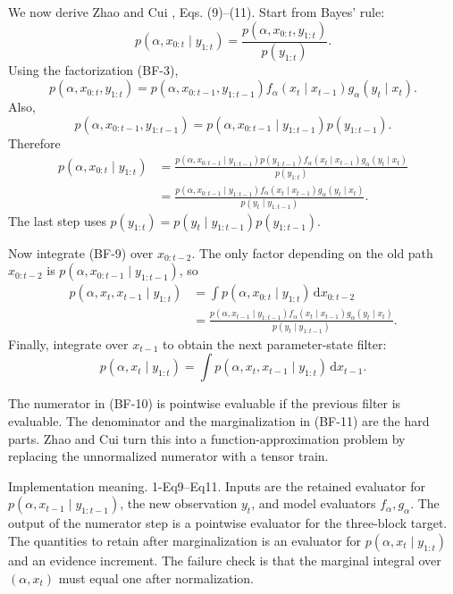 \documentclass[11pt]{article}
\numberwithin{equation}{section}
\newcommand{\dd}{\,\mathrm d}
\begin{document}
We now derive Zhao and Cui \cite{zhao2024ttsequential}, Eqs. (9)--(11).  Start from Bayes' rule:
\[
 p(\alpha,x_{0:t}\mid y_{1:t})
 =
 \frac{p(\alpha,x_{0:t},y_{1:t})}{p(y_{1:t})}.
\]
Using the factorization (BF-3),
\[
 p(\alpha,x_{0:t},y_{1:t})
 =
 p(\alpha,x_{0:t-1},y_{1:t-1})
 f_\alpha(x_t\mid x_{t-1})g_\alpha(y_t\mid x_t).
\]
Also,
\[
 p(\alpha,x_{0:t-1},y_{1:t-1})
 =
 p(\alpha,x_{0:t-1}\mid y_{1:t-1})p(y_{1:t-1}).
\]
Therefore
\begin{equation}
\begin{aligned}
 p(\alpha,x_{0:t}\mid y_{1:t})
 &=
 \frac{
 p(\alpha,x_{0:t-1}\mid y_{1:t-1})p(y_{1:t-1})
 f_\alpha(x_t\mid x_{t-1})g_\alpha(y_t\mid x_t)}
 {p(y_{1:t})}\\
 &=
 \frac{
 p(\alpha,x_{0:t-1}\mid y_{1:t-1})
 f_\alpha(x_t\mid x_{t-1})g_\alpha(y_t\mid x_t)}
 {p(y_t\mid y_{1:t-1})}.
\end{aligned}
\label{eq:p24-bf-9}
\end{equation}
The last step uses \(p(y_{1:t})=p(y_t\mid y_{1:t-1})p(y_{1:t-1})\).

Now integrate (BF-9) over \(x_{0:t-2}\).  The only factor depending on the old
path \(x_{0:t-2}\) is
\(p(\alpha,x_{0:t-1}\mid y_{1:t-1})\), so
\begin{equation}
\begin{aligned}
 p(\alpha,x_t,x_{t-1}\mid y_{1:t})
 &=
 \int p(\alpha,x_{0:t}\mid y_{1:t})\dd x_{0:t-2}\\
 &=
 \frac{
 p(\alpha,x_{t-1}\mid y_{1:t-1})
 f_\alpha(x_t\mid x_{t-1})g_\alpha(y_t\mid x_t)}
 {p(y_t\mid y_{1:t-1})}.
\end{aligned}
\label{eq:p24-bf-10}
\end{equation}
Finally, integrate over \(x_{t-1}\) to obtain the next parameter-state filter:
\begin{equation}
    p(\alpha,x_t\mid y_{1:t})
    =
    \int p(\alpha,x_t,x_{t-1}\mid y_{1:t})\dd x_{t-1}.
    \label{eq:p24-bf-11}
\end{equation}

The numerator in (BF-10) is pointwise evaluable if the previous filter is
evaluable.  The denominator and the marginalization in (BF-11) are the hard
parts.  Zhao and Cui \cite{zhao2024ttsequential} turn this into a function-approximation problem by replacing
the unnormalized numerator with a tensor train.

Implementation meaning. 1-Eq9--Eq11.  Inputs are the retained evaluator
for \(p(\alpha,x_{t-1}\mid y_{1:t-1})\), the new observation \(y_t\), and model
evaluators \(f_\alpha,g_\alpha\).  The output of the numerator step is a
pointwise evaluator for the three-block target.  The quantities to retain after
marginalization is an evaluator for \(p(\alpha,x_t\mid y_{1:t})\) and an
evidence increment.  The failure check is that the marginal integral over
\((\alpha,x_t)\) must equal one after normalization.
\end{document}

